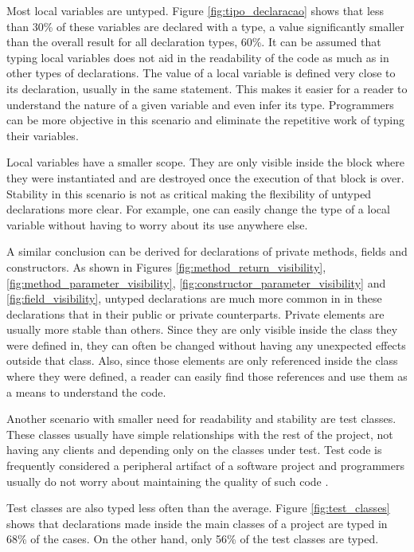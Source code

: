 \documentclass[preprint]{sigplanconf}
\begin{document}
Most local variables are untyped.
Figure \ref{fig:tipo_declaracao} shows that less than 30\% of these variables are declared with a type, a value significantly smaller than the overall result for all declaration types, 60\%.
It can be assumed that typing local variables does not aid in the readability of the code as much as in other types of declarations.
The value of a local variable is defined very close to its declaration, usually in the same statement.
This makes it easier for a reader to understand the nature of a given variable and even infer its type.
Programmers can be more objective in this scenario and eliminate the repetitive work of typing their variables.

Local variables have a smaller scope.
They are only visible inside the block where they were instantiated and are destroyed once the execution of that block is over.
Stability in this scenario is not as critical making the flexibility of untyped declarations more clear.
For example, one can easily change the type of a local variable without having to worry about its use anywhere else.

A similar conclusion can be derived for declarations of private methods, fields and constructors.
As shown in Figures \ref{fig:method_return_visibility}, \ref{fig:method_parameter_visibility}, \ref{fig:constructor_parameter_visibility} and \ref{fig:field_visibility}, untyped declarations are much more common in in these declarations that in their public or private counterparts.
Private elements are usually more stable than others.
Since they are only visible inside the class they were defined in, they can often be changed without having any unexpected effects outside that class.
Also, since those elements are only referenced inside the class where they were defined, a reader can easily find those references and use them as a means to understand the code.

Another scenario with smaller need for readability and stability are test classes.
These classes usually have simple relationships with the rest of the project, not having any clients and depending only on the classes under test.
Test code is frequently considered a peripheral artifact of a software project and programmers usually do not worry about maintaining the quality of such code \cite{Meszaros07}.

Test classes are also typed less often than the average.
Figure \ref{fig:test_classes} shows that declarations made inside the main classes of a project are typed in 68\% of the cases.
On the other hand, only 56\% of the test classes are typed.
\end{document}
